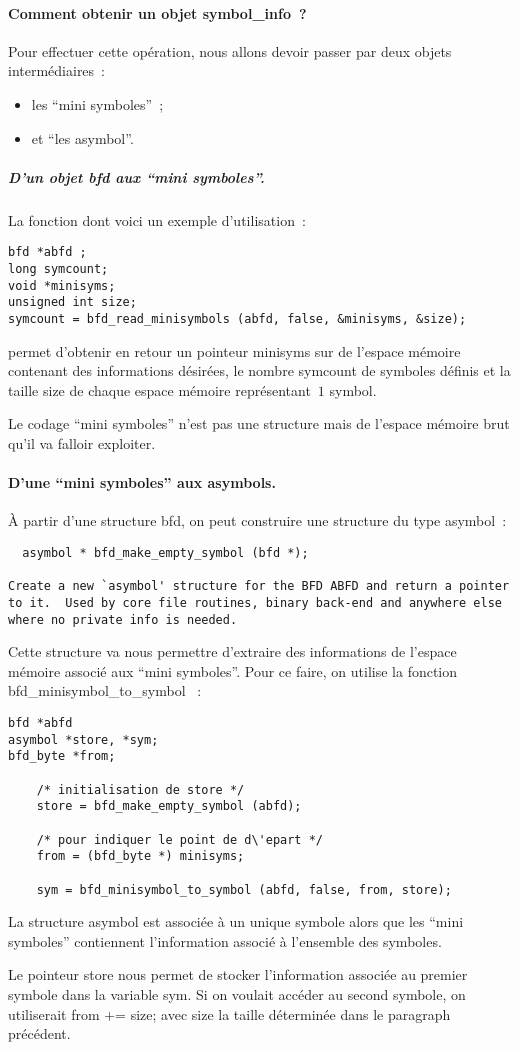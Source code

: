 \documentclass{article}
\begin{document}
\paragraph{Comment obtenir un objet symbol\_info~?}
Pour effectuer cette op\'eration, nous allons devoir passer par deux
objets interm\'ediaires~:
\begin{itemize}
\item les ``mini symboles''~;
\item et ``les asymbol''.
\end{itemize}
\subparagraph{D'un objet bfd aux ``mini symboles''.}
La fonction dont voici un exemple d'utilisation~:
\begin{verbatim}
bfd *abfd ;
long symcount;
void *minisyms;
unsigned int size;
symcount = bfd_read_minisymbols (abfd, false, &minisyms, &size);
\end{verbatim}
permet d'obtenir en retour un pointeur minisyms sur de l'espace
m\'emoire contenant des informations d\'esir\'ees, le nombre symcount
de symboles d\'efinis et la taille size de chaque espace m\'emoire
repr\'esentant~$1$ symbol.
\par
Le codage ``mini symboles'' n'est pas une structure mais de l'espace
m\'emoire brut qu'il va falloir exploiter.
\paragraph{D'une ``mini symboles'' aux asymbols.}
\`A partir d'une structure bfd, on peut construire une structure du
type asymbol~:
\begin{verbatim}
  asymbol * bfd_make_empty_symbol (bfd *);

Create a new `asymbol' structure for the BFD ABFD and return a pointer
to it.  Used by core file routines, binary back-end and anywhere else
where no private info is needed.
\end{verbatim}
Cette structure va nous permettre d'extraire des informations de
l'espace m\'emoire associ\'e aux ``mini symboles''.
Pour ce faire, on utilise la fonction bfd\_minisymbol\_to\_symbol ~:
\begin{verbatim}
bfd *abfd
asymbol *store, *sym;
bfd_byte *from;

    /* initialisation de store */
    store = bfd_make_empty_symbol (abfd);

    /* pour indiquer le point de d\'epart */
    from = (bfd_byte *) minisyms;
    
    sym = bfd_minisymbol_to_symbol (abfd, false, from, store);
\end{verbatim}
La structure asymbol est associ\'ee \`a un unique symbole alors que
les ``mini symboles'' contiennent l'information associ\'e \`a
l'ensemble des symboles.
\par
Le pointeur store nous permet de stocker l'information associ\'ee au
premier symbole dans la variable sym. Si on voulait acc\'eder au
second symbole, on utiliserait from += size; avec size la taille
d\'etermin\'ee dans le paragraph pr\'ec\'edent.
\end{document}
